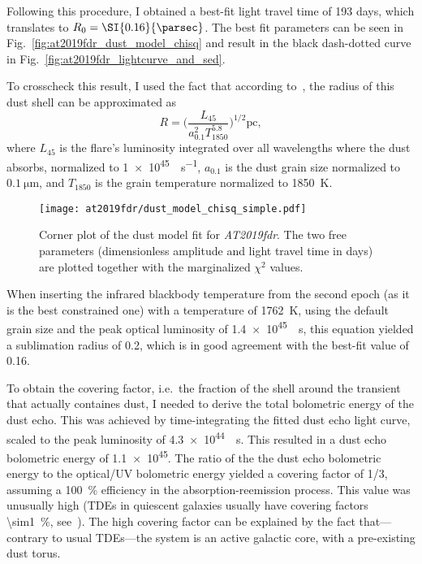 Following this procedure, I obtained a best-fit light travel time of 193 days, which translates to $R_0=\SI{0.16}{\parsec}$. The best fit parameters can be seen in Fig.~\ref{fig:at2019fdr_dust_model_chisq} and result in the black dash-dotted curve in Fig.~\ref{fig:at2019fdr_lightcurve_and_sed}.

To crosscheck this result, I used the fact that according to~\cite{Velzen2016}, the radius of this dust shell can be approximated as
\begin{equation}
    R= \bigg(\frac{L_{45}}{a_{0.1}^2 T_{1850}^{5.8}} \bigg)^{1/2} \text{pc},
\end{equation}
where $L_{45}$ is the flare's luminosity integrated over all wavelengths where the dust absorbs, normalized to \SI{1e45}{\erg\per\s}, $a_{0.1}$ is the dust grain size normalized to $\SI{0.1}{\micro\m}$, and $T_{1850}$ is the grain temperature normalized to \SI{1850}{\K}.

\begin{figure}[htb]
    \texttt{[image: at2019fdr/dust\_model\_chisq\_simple.pdf]}
    \caption[Dust model fit corner plot]{Corner plot of the dust model fit for \emph{AT2019fdr}. The two free parameters (dimensionless amplitude and light travel time in days) are plotted together with the marginalized $\chi^2$ values.}
\end{figure}

When inserting the infrared blackbody temperature from the second epoch (as it is the best constrained one) with a temperature of \SI{1762}{\K}, using the default grain size and the peak optical luminosity of \SI{1.4e45}{\erg\s}, this equation yielded a sublimation radius of \SI{0.2}{\parsec}, which is in good agreement with the best-fit value of \SI{0.16}{\parsec}.

To obtain the covering factor, i.e.\ the fraction of the shell around the transient that actually containes dust, I needed to derive the total bolometric energy of the dust echo. This was achieved by time-integrating the fitted dust echo light curve, scaled to the peak luminosity of \SI{4.3e44}{\erg\s}. This resulted in a dust echo bolometric energy of \SI{1.1e45}{\erg}. The ratio of the the dust echo bolometric energy to the optical/UV bolometric energy yielded a covering factor of 1/3, assuming a \SI{100}{\percent} efficiency in the absorption-reemission process. This value was unusually high (TDEs in quiescent galaxies usually have covering factors \SI{\sim1}{\percent}, see~\cite{Velzen2016}). The high covering factor can be explained by the fact that---contrary to usual TDEs---the system is an active galactic core, with a pre-existing dust torus.

